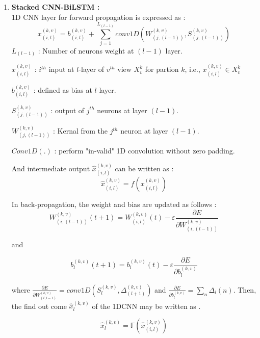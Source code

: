\documentclass[a4paper, fleqn]{cas-sc}
\theoremstyle{definition}
\theoremstyle{remark}
\begin{document}
\begin{enumerate}[label=(\alph*)]
\item \textbf{Stacked CNN-BiLSTM : } \\
1D CNN layer for forward propagation is expressed as  : 
\begin{equation} \label{1dcnn}
  x_{(i, l)}^{(k, v)}=b_{(i, l)}^{(k, v)} + \sum_{j=1}^{L_{(l-1)}} conv1D \left(W_{(j, (l-1))}^{(k, v)},  S_{(j, (l-1))}^{(k, v)} \right)
\end{equation}
$L_{(l-1)}$ :  Number of neurons weight at $(l-1)$ layer.

$x_{(i, l)}^{(k, v)}$ :  $i^{th}$ input at $l$-layer of $v^{th}$ view $X_v^k$ for partion  $k$,  i.e.,  $x_{(i, l)}^{(k, v)} \in X_v^k$

$b_{(i, l)}^{(k, v)}$ :  defined as bias at $l$-layer.

$S_{(j, (l-1))}^{(k, v)}$ :  output of $j^{th}$ neurons at layer $(l-1)$.

$W_{(j, (l-1))}^{(k, v)}$ :  Kernal from the $j^{th}$ neuron at layer $(l-1)$.

$Conv1D (.)$ :  perform "in-valid" 1D convolution without zero padding.

And intermediate output $\hat{x}_{(i, l)}^{(k, v)}$ can be written as \Cref{1dd} :  
\begin{equation} \label{1dd}
  \hat{x}_{(i, l)}^{(k, v)}= f\left( x_{(i, l)}^{(k, v)} \right)
\end{equation}

In back-propagation,  the weight and bias are updated as follows : 
\begin{equation} \label{backp}
  W_{(i, (l-1))}^{(k, v)} (t+1) =W_{(i, l)}^{(k, v)}(t)- \varepsilon \frac{\partial E}{\partial W_{(i, (l-1))}^{(k, v)}}
\end{equation}

and 

\begin{equation} \label{bias}
  b_l^{(k, v)} (t+1) = b_l^{(k, v)}(t)- \varepsilon \frac{\partial E}{\partial b_l^{(k, v)}}
\end{equation}

where $\frac{\partial E}{\partial W_{(i, l-1)}^{(k, v)}} =conv1D \left(S_l^{(k, v)},  \Delta_{(l+1)}^{(k, v)} \right)$ and $\frac{\partial E}{\partial b_l^{(k, v)} }=\sum_{n}^{}\Delta_{l} (n)$. 
Then,  the find out come $\hat{x}_l^{(k, v)}$ of the 1DCNN may be written as .

\begin{equation} \label{1dd hat}
  \hat{x}_l^{(k, v)}=\mathbb{F} \left(\hat{x}_{(i, l)}^{(k, v)} \right )
\end{equation}


\end{enumerate}
\end{document}
